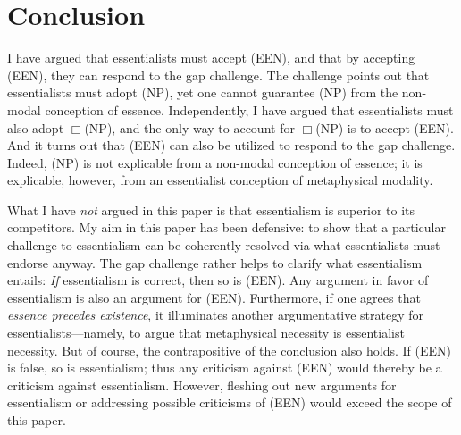 \documentclass[12pt]{article}
\begin{document}
\section{Conclusion}
I have argued that essentialists must accept (EEN), and that by accepting (EEN), they can respond to the gap challenge. The challenge points out that essentialists must adopt (NP), yet one cannot guarantee (NP) from the non-modal conception of essence. Independently, I have argued that essentialists must also adopt $\Box$(NP), and the only way to account for $\Box$(NP) is to accept (EEN). And it turns out that (EEN) can also be utilized to respond to the gap challenge. Indeed, (NP) is not explicable from a non-modal conception of essence; it is explicable, however, from an essentialist conception of metaphysical modality.
\par
What I have \textit{not} argued in this paper is that essentialism is superior to its competitors. My aim in this paper has been defensive: to show that a particular challenge to essentialism can be coherently resolved via what essentialists must endorse anyway. The gap challenge rather helps to clarify what essentialism entails: \textit{If} essentialism is correct, then so is (EEN). Any argument in favor of essentialism is also an argument for (EEN). Furthermore, if one agrees that \textit{essence precedes existence}, it illuminates another argumentative strategy for essentialists---namely, to argue that metaphysical necessity is essentialist necessity. But of course, the contrapositive of the conclusion also holds. If (EEN) is false, so is essentialism; thus any criticism against (EEN) would thereby be a criticism against essentialism. However, fleshing out new arguments for essentialism or addressing possible criticisms of (EEN) would exceed the scope of this paper. 
\begin{singlespace}
     
\end{singlespace}
\end{document}
